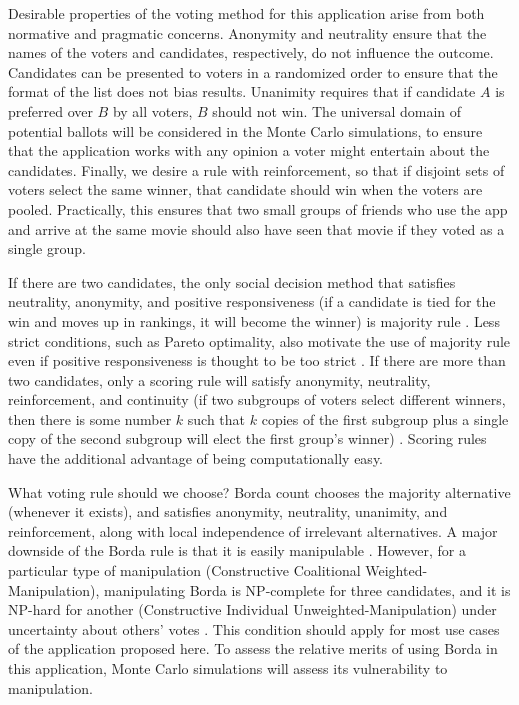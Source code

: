 \documentclass{article}
\begin{document}

Desirable properties of the voting method for this application arise from both normative and pragmatic concerns. Anonymity and neutrality ensure that the names of the voters and candidates, respectively, do not influence the outcome. Candidates can be presented to voters in a randomized order to ensure that the format of the list does not bias results. Unanimity requires that if candidate $A$ is preferred over $B$ by all voters, $B$ should not win. The universal domain of potential ballots will be considered in the Monte Carlo simulations, to ensure that the application works with any opinion a voter might entertain about the candidates. Finally, we desire a rule with reinforcement, so that if disjoint sets of voters select the same winner, that candidate should win when the voters are pooled. Practically, this ensures that two small groups of friends who use the app and arrive at the same movie should also have seen that movie if they voted as a single group.

If there are two candidates, the only social decision method that satisfies neutrality, anonymity, and positive responsiveness (if a candidate is tied for the win and moves up in rankings, it will become the winner) is majority rule \citep{may1952}. Less strict conditions, such as Pareto optimality, also motivate the use of majority rule even if positive responsiveness is thought to be too strict \citep{acsan2002,j2003majority}. If there are more than two candidates, only a scoring rule will satisfy anonymity, neutrality, reinforcement, and continuity (if two subgroups of voters select different winners, then there is some number $k$ such that $k$ copies of the first subgroup plus a single copy of the second subgroup will elect the first group's winner) \citep{young1975}. Scoring rules have the additional advantage of being computationally easy.

What voting rule should we choose? Borda count chooses the majority alternative (whenever it exists), and satisfies anonymity, neutrality, unanimity, and reinforcement, along with local independence of irrelevant alternatives. A major downside of the Borda rule is that it is easily manipulable \citep{bartholdi1989computational}. However, for a particular type of manipulation (Constructive Coalitional Weighted-Manipulation), manipulating Borda is NP-complete for three candidates, and it is NP-hard for another (Constructive Individual Unweighted-Manipulation) under uncertainty about others' votes \citep{conitzer2007elections}. This condition should apply for most use cases of the application proposed here. To assess the relative merits of using Borda in this application, Monte Carlo simulations will assess its vulnerability to manipulation.
\end{document}
